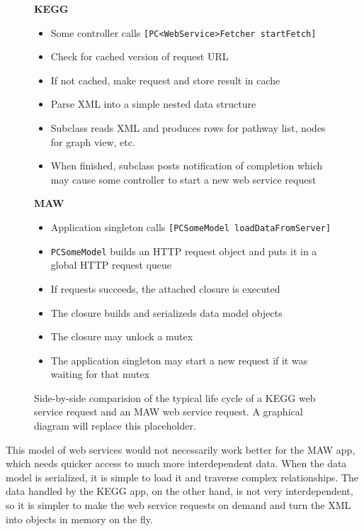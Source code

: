 \begin{figure}[hbt]
    \textbf{KEGG}
    \begin{itemize}
        \item Some controller calls \texttt{[PC<WebService>Fetcher startFetch]}
        \item Check for cached version of request URL
        \item If not cached, make request and store result in cache
        \item Parse XML into a simple nested data structure
        \item Subclass reads XML and produces rows for pathway list, nodes for
            graph view, etc.
        \item When finished, subclass posts notification of completion which may
            cause some controller to start a new web service request
    \end{itemize}
    \textbf{MAW}
    \begin{itemize}
        \item Application singleton calls \texttt{[PCSomeModel
            loadDataFromServer]}
        \item \texttt{PCSomeModel} builds an HTTP request object and puts it in
            a global HTTP request queue
        \item If requests succeeds, the attached closure is executed
        \item The closure builds and serializeds data model objects
        \item The closure may unlock a mutex
        \item The application singleton may start a new request if it was
            waiting for that mutex
    \end{itemize}
    \caption{\label{fig:kegg_impl_web_service_differences} Side-by-side
    comparision of the typical life cycle of a KEGG web service request and an
    MAW web service request. A graphical diagram will replace this
    placeholder.}
\end{figure}

This model of web services would not necessarily work better for the MAW app,
which needs quicker access to much more interdependent data. When the data model
is serialized, it is simple to load it and traverse complex relationships. The
data handled by the KEGG app, on the other hand, is not very interdependent, so
it is simpler to make the web service requests on demand and turn the XML into
objects in memory on the fly.

